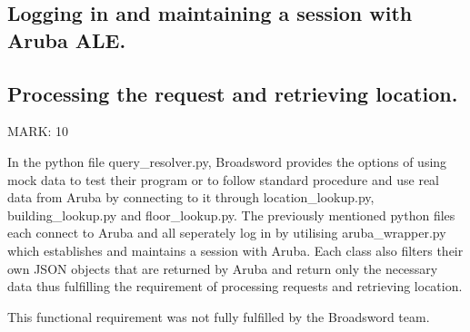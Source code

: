 \documentclass{article}
\begin{document}
\subsection{Logging in and maintaining a session with Aruba ALE.}


\subsection{Processing the request and retrieving location.}

\begin{flushleft}
MARK: 10
\end{flushleft}

\begin{flushleft}
In the python file query\_resolver.py, Broadsword provides the options of using mock data to test their program or to follow standard procedure and use real data from Aruba by connecting to it through location\_lookup.py, building\_lookup.py and floor\_lookup.py. The previously mentioned python files each connect to Aruba and all seperately log in by utilising aruba\_wrapper.py which establishes and maintains a session with Aruba. Each class also filters their own JSON objects that are returned by Aruba and return only the necessary data thus fulfilling the requirement of processing requests and retrieving location. 
\end{flushleft}
  
\begin{flushleft}
This functional requirement was not fully fulfilled by the Broadsword team.
\end{flushleft}
\end{document}
